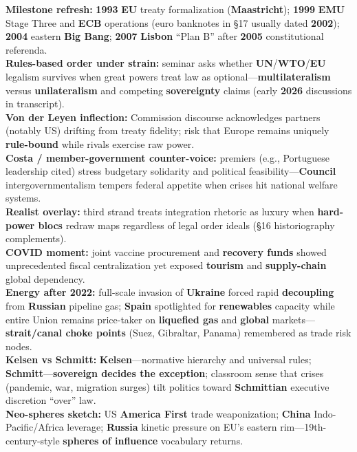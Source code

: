 \documentclass[10pt,a4paper]{article}
\begin{document}
{
\textbf{Milestone refresh:} \textbf{1993} \textbf{EU} treaty formalization (\textbf{Maastricht}); \textbf{1999} \textbf{EMU} Stage Three and \textbf{ECB} operations (euro banknotes in \S 17 usually dated \textbf{2002}); \textbf{2004} eastern \textbf{Big Bang}; \textbf{2007} \textbf{Lisbon} ``Plan B'' after \textbf{2005} constitutional referenda.\\
\textbf{Rules-based order under strain:} seminar asks whether \textbf{UN}/\textbf{WTO}/\textbf{EU} legalism survives when great powers treat law as optional---\textbf{multilateralism} versus \textbf{unilateralism} and competing \textbf{sovereignty} claims (early \textbf{2026} discussions in transcript).\\
\textbf{Von der Leyen inflection:} Commission discourse acknowledges partners (notably US) drifting from treaty fidelity; risk that Europe remains uniquely \textbf{rule-bound} while rivals exercise raw power.\\
\textbf{Costa / member-government counter-voice:} premiers (e.g., Portuguese leadership cited) stress budgetary solidarity and political feasibility---\textbf{Council} intergovernmentalism tempers federal appetite when crises hit national welfare systems.\\
\textbf{Realist overlay:} third strand treats integration rhetoric as luxury when \textbf{hard-power blocs} redraw maps regardless of legal order ideals (\S 16 historiography complements).\\
\textbf{COVID moment:} joint vaccine procurement and \textbf{recovery funds} showed unprecedented fiscal centralization yet exposed \textbf{tourism} and \textbf{supply-chain} global dependency.\\
\textbf{Energy after 2022:} full-scale invasion of \textbf{Ukraine} forced rapid \textbf{decoupling} from \textbf{Russian} pipeline gas; \textbf{Spain} spotlighted for \textbf{renewables} capacity while entire Union remains price-taker on \textbf{liquefied gas} and \textbf{global} markets---\textbf{strait/canal choke points} (Suez, Gibraltar, Panama) remembered as trade risk nodes.\\
\textbf{Kelsen vs Schmitt:} \textbf{Kelsen}---normative hierarchy and universal rules; \textbf{Schmitt}---\textbf{sovereign decides the exception}; classroom sense that crises (pandemic, war, migration surges) tilt politics toward \textbf{Schmittian} executive discretion ``over'' law.\\
\textbf{Neo-spheres sketch:} US \textbf{America First} trade weaponization; \textbf{China} Indo-Pacific/Africa leverage; \textbf{Russia} kinetic pressure on EU's eastern rim---19th-century-style \textbf{spheres of influence} vocabulary returns.\\
}
\end{document}
